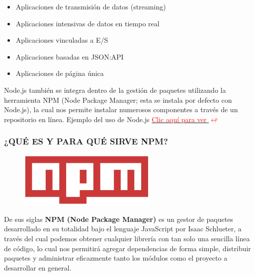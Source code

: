 \begin{itemize}
   \renewcommand{\labelitemi} {\textcolor{red}{$\bigstar$}}
    \item Aplicaciones de transmisión de datos (streaming)
    \item Aplicaciones intensivas de datos en tiempo real
    \item Aplicaciones vinculadas a E/S
    \item Aplicaciones basadas en JSON:API
    \item Aplicaciones de página única\cite{Nodejs}
\end{itemize}
\newpage
Node.js también se integra dentro de la gestión de paquetes utilizando la herramienta NPM (Node Package Manager; esta se instala por defecto con Node.js), la cual nos permite instalar numerosos componentes a través de un repositorio en línea.
Ejemplo del uso de Node.js \hyperlink{EJEMPLONODE}{\textcolor{red}{Clic aquí para ver} \textcolor{red}{$\looparrowleft$}}

\subsubsection{¿QUÉ ES Y PARA QUÉ SIRVE NPM?}

\begin{figure}[H]
    \centering
    \includegraphics[width=0.6\textwidth]{img/NPM.png}
\end{figure}

De sus siglas \hypertarget{camannpm}{\textbf{NPM (Node Package Manager) }}es un gestor de paquetes desarrollado en su totalidad bajo el lenguaje JavaScript por Isaac Schlueter, a través del cual podemos obtener cualquier librería con tan solo una sencilla línea de código, lo cual nos permitirá agregar dependencias de forma simple, distribuir paquetes y administrar eficazmente tanto los módulos como el proyecto a desarrollar en general.\cite{Npmjs}





